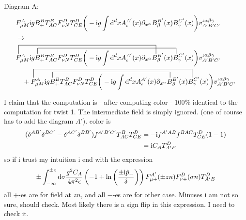 \ifdefined\mainprogram{}
\else

\fi
Diagram A:
\begin{align}
	&\ft_{\mu M}^{A} \imag g B_+^B  T^B_{AC} \ft _{\nu N}^D T^D_{CE}\bigg(-\imag g \int \ddx xA_\iota^{A'}(x) \partial_{x^\alpha} B_\beta^{B'} (x) B_\gamma^{C'}(x) \bigg) v^{\iota \alpha\beta\gamma}_{A'B'C'}
	\\
	&\rightarrow
	\\
	\contraction[3ex]{}{\ft}{_{\mu M}^{A} \imag g B_+^B  T^B_{AC} \ft _{\nu N}^D T^D_{CE}\bigg(-\imag g \int \ddx xA_\iota^{A'}(x) \partial_{x^\alpha}}{B}
	\contraction[2ex]{\ft_{\mu M}^{A} \imag g}{B}{_+^B  T^B_{AC} \ft _{\nu N}^D T^D_{CE}\bigg(-\imag g \int \ddx xA_\iota^{A'}(x) \partial_{x^\alpha} B_\beta^{B'} (x)}{B}
	&\ft_{\mu M}^{A} \imag g B_+^B  T^B_{AC} \ft _{\nu N}^D T^D_{CE}\bigg(-\imag g \int \ddx xA_\iota^{A'}(x) \partial_{x^\alpha} B_\beta^{B'} (x) B_\gamma^{C'}(x) \bigg) v^{\iota \alpha\beta\gamma}_{A'B'C'}
	\nl
	+
	\contraction[3ex]{}{\ft}{_{\mu M}^{A} \imag g B_+^B  T^B_{AC} \ft _{\nu N}^D T^D_{CE}\bigg(-\imag g \int \ddx xA_\iota^{A'}(x) \partial_{x^\alpha} B_\beta^{B'} (x)}{B}
	\contraction[2ex]{\ft_{\mu M}^{A} \imag g}{B}{_+^B  T^B_{AC} \ft _{\nu N}^D T^D_{CE}\bigg(-\imag g \int \ddx xA_\iota^{A'}(x) \partial_{x^\alpha}}{B}
	\ft_{\mu M}^{A} \imag g B_+^B  T^B_{AC} \ft _{\nu N}^D T^D_{CE}\bigg(-\imag g \int \ddx xA_\iota^{A'}(x) \partial_{x^\alpha} B_\beta^{B'} (x) B_\gamma^{C'}(x) \bigg) v^{\iota \alpha\beta\gamma}_{A'B'C'}	
\end{align}

I claim that the computation is - after computing color - 100\% identical to the computation for twist 1. The intermediate field is simply ignored. (one of course has to add the diagram $A'$).
color is 
\begin{align}
	(\delta^{AB'} \delta^{BC'} -\delta^{AC'}\delta^{BB'}) f^{A'B'C'} T^{B}_{AC} T^{D}_{CE}
	&= - \text{i} f^{A'AB}f^{BAC} T^D_{CE}(1-1)
	\\
	&=
	\text{i} C_A T_{A'E}^D
\end{align}
so if i trust my intuition i end with the expression
\begin{align}
	\pm\int_{-\infty}^{\pm z} \text{d} \sigma\frac{  g^2 C_A}{4\pi^2 \epsilon} \left(-1+\ln\left(\frac{\pm\text{i} \hat p_{+}}{\delta}\right)\right)
	F_{\mu +}^{A'}(\pm zn)F_{\nu +}^D(\sigma n)T^D_{A'E}
\end{align}
all $+$-es are for field at $zn$, and all $-$-es are for other case. Minuses i am not so sure, should check. Most likely there is a sign flip in this expression. 
I need to check it.

